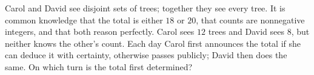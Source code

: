 Carol and David see disjoint sets of trees; together they see every tree. It is common knowledge that the total is either $18$ or $20$, that counts are nonnegative integers, and that both reason perfectly. Carol sees $12$ trees and David sees $8$, but neither knows the other's count. Each day Carol first announces the total if she can deduce it with certainty, otherwise passes publicly; David then does the same. On which turn is the total first determined?
